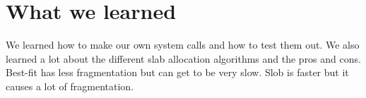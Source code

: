 \documentclass{article}
\begin{document}
\section{What we learned}
We learned how to make our own system calls and how to test them out. We also learned a lot about the different slab allocation algorithms and the pros and cons. Best-fit has less fragmentation but can get to be very slow. Slob is faster but it causes a lot of fragmentation.
\end{document}
